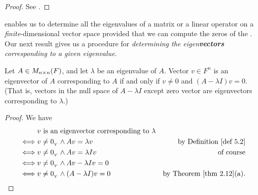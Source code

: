 \begin{proof}
See .
\end{proof}

 enables us to determine all the eigenvalues of a matrix or a linear operator on a \emph{finite}-dimensional vector space provided that we can compute the zeros of the \CPOLY{}.
Our next result gives us a procedure for \emph{determining the eigen\textbf{vectors} corresponding to a given eigenvalue}.

\begin{theorem} \label{thm 5.4}
Let \(A \in M_{n \times n}(F)\), and let \(\lambda\) be an eigenvalue of \(A\).
Vector \(v \in F^n\) is an eigenvector of \(A\) corresponding to \(A\) if and only if \(v \ne 0\) and \((A - \lambda I)v = 0\).
(That is, vectors in the null space of \(A - \lambda I\) except zero vector are eigenvectors corresponding to \(\lambda\).)
\end{theorem}

\begin{proof}
We have
\begin{align*}
         & v \text{ is an eigenvector corresponding to \(\lambda\)} \\
    \iff & v \ne \OV \land Av = \lambda v & \text{by \DEF{5.2}} \\
    \iff & v \ne \OV \land Av = \lambda I v & \text{of course} \\
    \iff & v \ne \OV \land Av - \lambda I v = 0 \\
    \iff & v \ne \OV \land (A - \lambda I) v = 0 & \text{by \THM{2.12}(a)}.
\end{align*}
\end{proof}

